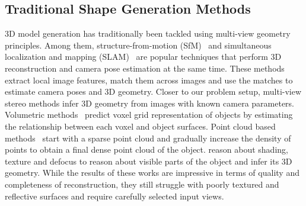 \subsection{Traditional Shape Generation Methods}
3D model generation has traditionally been tackled using multi-view geometry principles.
Among them, structure-from-motion (SfM)~\cite{schonberger2016structure,agarwal2011building,cui2015global,cui2017hsfm} and simultaneous localization and mapping (SLAM)~\cite{cadena2016pastslam,mur2015orb,engel2014lsd,whelan2015elasticfusion} are popular techniques that perform 3D reconstruction and camera pose estimation at the same time. These methods extract local image features, match them across images and use the matches to estimate camera poses and 3D geometry.
Closer to our problem setup, multi-view stereo methods infer 3D geometry from images with known camera parameters.
Volumetric methods~\cite{kar2017lsm, kutulakos2000theory, seitz1999photorealistic} predict voxel grid representation of objects by estimating the relationship between each voxel and object surfaces.
Point cloud based methods~\cite{furukawa2009accurate, lhuillier2005quasi} start with a sparse point cloud and
gradually increase the density of points to obtain a final dense point cloud of the object.
\cite{durou2008numerical,zhang1999shape,favaro2005geometric} reason about shading, texture and defocus to reason about visible parts of the object and infer its 3D geometry.
While the results of these works are impressive in terms of quality and completeness of reconstruction, they still struggle with poorly textured and reflective surfaces and require carefully selected input views.

